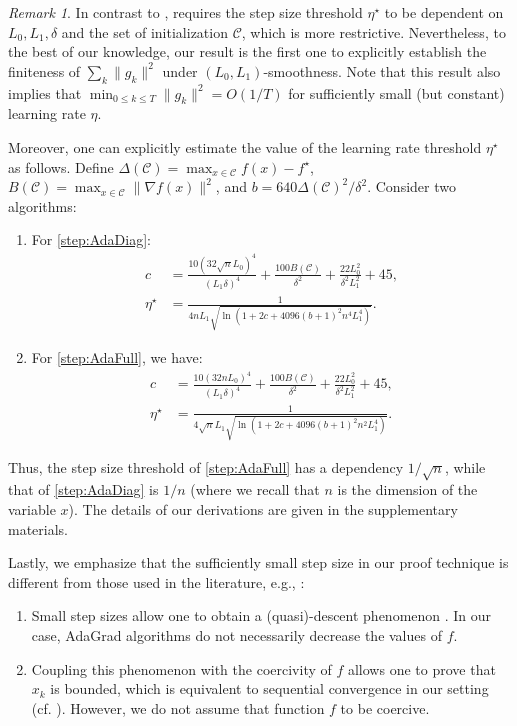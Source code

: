 \documentclass{article}
\theoremstyle{plain}
\theoremstyle{definition}
\theoremstyle{remark}
\newtheorem{remark}[theorem]{Remark}
\newcommand*{\cC}{\mathcal{C}}
\begin{document}
\begin{remark}
    In contrast to ,  requires the step size threshold $\eta^\star$ to be dependent on $L_0, L_1, \delta$ and the set of initialization $\cC$, which is more restrictive. Nevertheless, to the best of our knowledge, our result is the first one to explicitly establish the finiteness of $\sum_k \|g_k\|^2$ under $(L_0,L_1)$-smoothness. Note that this result also implies that $\min_{0 \leq k \leq T} \|g_k\|^2 = O(1/T)$ for sufficiently small (but constant) learning rate $\eta$. 

    Moreover, one can explicitly estimate the value of the learning rate threshold $\eta^\star$ as follows.
    Define
    $\Delta(\cC) = \max_{x \in \cC} f(x) - f^\star$, $B(\cC) = \max_{x \in \cC} \|\nabla f(x)\|^2$, and $b=640\Delta(\cC)^2 / \delta^2$.
     Consider two algorithms:
    \begin{enumerate}[leftmargin = *]
        \item For \ref{step:AdaDiag}:
        \begin{align*}
            c &= \frac{10(32\sqrt{n} L_0)^4}{(L_1\delta)^4} + \frac{100 B(\cC)}{\delta^2} + \frac{22L_0^2}{\delta^2L_1^2} + 45, \\
            \eta^\star &= \frac{1}{4nL_1\sqrt{\ln(1 + 2c + 4096(b+1)^2n^4L_1^4)}}.
        \end{align*}
        \item For \ref{step:AdaFull}, we have:
        \begin{align*}
            c &= \frac{10(32{n} L_0)^4}{(L_1\delta)^4} + \frac{100 B(\cC)}{\delta^2} + \frac{22L_0^2}{\delta^2L_1^2} + 45, \\ 
            \eta^\star &= \frac{1}{4\sqrt{n}L_1\sqrt{\ln(1 + 2c + 4096(b+1)^2n^2L_1^4)}}.
        \end{align*}
    \end{enumerate}
    Thus, the step size threshold of \ref{step:AdaFull} has a dependency $1/\sqrt{n}$, while that of \ref{step:AdaDiag} is $1/n$ (where we recall that $n$ is the dimension of the variable $x$). The details of our derivations are given in the supplementary materials. 
\end{remark}

Lastly, we emphasize that the sufficiently small step size in our proof technique is different from those used in the literature, e.g., \citet{bolte2025inexact,josz2024global}:
\begin{enumerate}[leftmargin=*]
    \item Small step sizes allow one to obtain a (quasi)-descent phenomenon \citep{bolte2025inexact,josz2024global}. In our case, AdaGrad algorithms do not necessarily decrease the values of $f$.
    \item Coupling this phenomenon with the coercivity of $f$ allows one to prove that $x_k$ is bounded, which is equivalent to sequential convergence in our setting (cf. ). However, we do not assume that function $f$ to be coercive. 
\end{enumerate}
\end{document}

